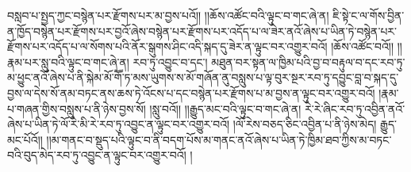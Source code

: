 བསླབ་པ་སྤྱད་ཀྱང་བསྙེན་པར་རྫོགས་པར་མ་བྱས་པའོ།། །།ཆོས་འཚོང་བའི་ལྟུང་བ་གང་ཞེ་ན། ཇི་སྟེ་ང་ལ་གོས་བྱིན་ན་ཁྱོད་བསྙེན་པར་རྫོགས་པར་བྱའོ་ཞེས་བསྙེན་པར་རྫོགས་པར་འདོད་པ་ལ་ཟེར་ནའོ་ཞེས་པ་ཡིན་ཏེ་བསྙེན་པར་རྫོགས་པར་འདོད་པ་ལ་སོགས་པའི་ནོར་སྒུགས་ཤིང་འདི་སྐད་དུ་ཟེར་ན་ལྟུང་བར་འགྱུར་བའོ། །ཆོས་འཚོང་བའོ།། །།རྣམ་པར་སླུ་བའི་ལྟུང་བ་གང་ཞེ་ན། རབ་ཏུ་འབྱུང་བ་དང་། མཐུན་བར་སྟན་ལ་ཁྱིམ་པའི་བྱ་བ་བརྟུལ་བ་དང་རབ་ཏུ་མ་ཕྱུང་ནའོ་ཞེས་པ་ནི་སྐེམ་མོ་གཽ་ཏ་མས་ཡུགས་ས་མོ་གཞོན་ནུ་བསླུས་པ་ལྟ་བུར་སྔར་རབ་ཏུ་དབྱུང་བླ་བ་སྐད་དུ་བྱས་ལ་དེས་སོ་ནམ་བཏང་ནས་ཆས་ཏེ་འོངས་པ་དང་བསྙེན་པར་རྫོགས་པ་མ་བྱས་ན་ལྟུང་བར་འགྱུར་བའོ། །རྣམ་པ་གཞན་གྱིས་བསླུས་པ་ནི་ཉེས་བྱས་སོ། །སླུ་བའོ།། །།རྒྱུད་མང་བའི་ལྟུང་བ་གང་ཞེ་ན། རེ་རེ་ཞིང་རབ་ཏུ་འབྱིན་ནའོ་ཞེས་པ་ཡིན་ཏེ་ལོ་རེ་མི་རེ་རབ་ཏུ་འབྱུང་ན་ལྟུང་བར་འགྱུར་བའོ། །ལོ་རེས་བཅད་ཅིང་འབྱིན་པ་ནི་ཉེས་མེད། རྒྱུད་མང་པོའོ།། །།མ་གནང་བ་སྡུད་པའི་ལྟུང་བ་ནི་བདག་པོས་མ་གནང་ནའོ་ཞེས་པ་ཡིན་ཏེ་ཁྱིམ་ཐབ་ཀྱིས་མ་བཏང་བའི་བུད་མེད་རབ་ཏུ་འབྱུང་ན་ལྟུང་བར་འགྱུར་བའོ། །
